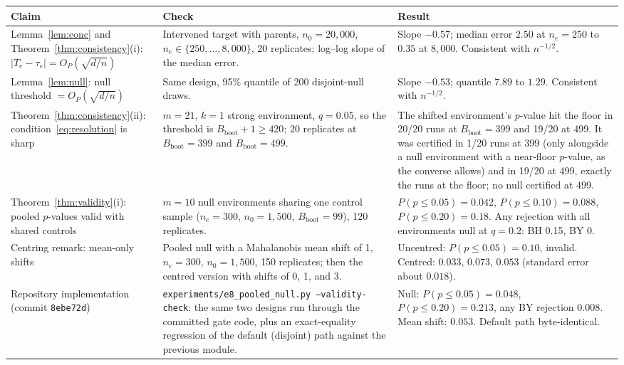 \documentclass[11pt]{article}
\theoremstyle{remark}
\newcommand{\Bb}{B_{\mathrm{boot}}}
\begin{document}
\begin{table}[h]
\centering
\small
\begin{tabular}{p{3.6cm}p{6.2cm}p{4.6cm}}
\toprule
Claim & Check & Result \\
\midrule
Lemma~\ref{lem:conc} and Theorem~\ref{thm:consistency}(i): $|T_e-\tau_e|=O_P(\sqrt{d/n})$ &
Intervened target with parents, $n_0=20{,}000$, $n_e\in\{250,\ldots,8{,}000\}$, 20 replicates; log--log slope of the median error. &
Slope $-0.57$; median error $2.50$ at $n_e=250$ to $0.35$ at $8{,}000$. Consistent with $n^{-1/2}$. \\
Lemma~\ref{lem:null}: null threshold $=O_P(\sqrt{d/n})$ &
Same design, 95\% quantile of 200 disjoint-null draws. &
Slope $-0.53$; quantile $7.89$ to $1.29$. Consistent with $n^{-1/2}$. \\
Theorem~\ref{thm:consistency}(ii): condition~\eqref{eq:resolution} is sharp &
$m=21$, $k=1$ strong environment, $q=0.05$, so the threshold is $\Bb+1\ge420$; 20 replicates at $\Bb=399$ and $\Bb=499$. &
The shifted environment's $p$-value hit the floor in 20/20 runs at $\Bb=399$ and 19/20 at $499$. It was certified in 1/20 runs at 399 (only alongside a null environment with a near-floor $p$-value, as the converse allows) and in 19/20 at 499, exactly the runs at the floor; no null certified at 499. \\
Theorem~\ref{thm:validity}(i): pooled $p$-values valid with shared controls &
$m=10$ null environments sharing one control sample ($n_e=300$, $n_0=1{,}500$, $\Bb=99$), 120 replicates. &
$P(p\le0.05)=0.042$, $P(p\le0.10)=0.088$, $P(p\le0.20)=0.18$. Any rejection with all environments null at $q=0.2$: BH 0.15, BY 0. \\
Centring remark: mean-only shifts &
Pooled null with a Mahalanobis mean shift of 1, $n_e=300$, $n_0=1{,}500$, 150 replicates; then the centred version with shifts of 0, 1, and 3. &
Uncentred: $P(p\le0.05)=0.10$, invalid. Centred: $0.033$, $0.073$, $0.053$ (standard error about $0.018$). \\
Repository implementation (commit \texttt{8ebe72d}) &
\texttt{experiments/e8\_pooled\_null.py --validity-check}: the same two designs run through the committed gate code, plus an exact-equality regression of the default (disjoint) path against the previous module. &
Null: $P(p\le0.05)=0.048$, $P(p\le0.20)=0.213$, any BY rejection $0.008$. Mean shift: $0.053$. Default path byte-identical. \\
\bottomrule
\end{tabular}
\end{table}
\end{document}

